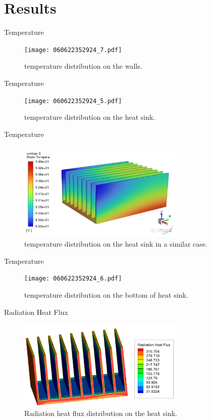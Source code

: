 \documentclass[10pt, xcolor=table]{beamer}
\begin{document}
\section{Results}
\begin{frame}{Temperature}
	\begin{figure}
		\texttt{[image: 060622352924\_7.pdf]}
		\caption{temperature distribution on the walls.}
	\end{figure}
\end{frame}
\begin{frame}{Temperature}
	\begin{figure}
		\texttt{[image: 060622352924\_5.pdf]}
		\caption{temperature distribution on the heat sink.}
	\end{figure}	
\end{frame}
\begin{frame}{Temperature}
	\begin{figure}
		\includegraphics[width=8cm, trim={0 1cm 0 1cm}]{微信图片_20220606231543.png}
		\caption{temperature distribution on the heat sink in a similar case.}
	\end{figure}
\end{frame}
\begin{frame}{Temperature}
	\begin{figure}
		\texttt{[image: 060622352924\_6.pdf]}
		\caption{temperature distribution on the bottom of heat sink.}
	\end{figure}
\end{frame}
\begin{frame}{Radiation Heat Flux}
	\begin{figure}
		\includegraphics[width=8cm, trim={0 0cm 0 1cm}]{figure15.png}
		\caption{Radiation heat flux distribution on the heat sink.}
	\end{figure}
\end{frame}
\end{document}
